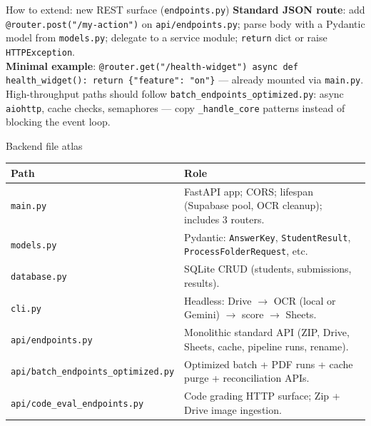 \documentclass[aspectratio=169]{beamer}
\begin{document}
\begin{frame}{How to extend: new REST surface (\texttt{endpoints.py})}
  \tiny
  \textbf{Standard JSON route}: add \texttt{@router.post("/my-action")} on \texttt{api/endpoints.py}; parse body with a Pydantic model from \texttt{models.py}; delegate to a service module; \texttt{return} dict or raise \texttt{HTTPException}.\\
  \textbf{Minimal example}: \texttt{@router.get("/health-widget") async def health\_widget(): return \{"feature": "on"\}} --- already mounted via \texttt{main.py}.\\
  High-throughput paths should follow \texttt{batch\_endpoints\_optimized.py}: async \texttt{aiohttp}, cache checks, semaphores --- copy \texttt{\_handle\_core} patterns instead of blocking the event loop.
\end{frame}

\begin{frame}{Backend file atlas}
  \tiny
  \begin{tabular}{@{}p{4.8cm}p{9.0cm}@{}}
    \toprule
    Path & Role \\
    \midrule
    \texttt{main.py} & FastAPI app; CORS; lifespan (Supabase pool, OCR cleanup); includes 3 routers. \\
    \texttt{models.py} & Pydantic: \texttt{AnswerKey}, \texttt{StudentResult}, \texttt{ProcessFolderRequest}, etc. \\
    \texttt{database.py} & SQLite CRUD (students, submissions, results). \\
    \texttt{cli.py} & Headless: Drive $\rightarrow$ OCR (local or Gemini) $\rightarrow$ score $\rightarrow$ Sheets. \\
    \texttt{api/endpoints.py} & Monolithic standard API (ZIP, Drive, Sheets, cache, pipeline runs, rename). \\
    \texttt{api/batch\_endpoints\_optimized.py} & Optimized batch + PDF runs + cache purge + reconciliation APIs. \\
    \texttt{api/code\_eval\_endpoints.py} & Code grading HTTP surface; Zip + Drive image ingestion. \\
    \bottomrule
  \end{tabular}
\end{frame}
\end{document}

